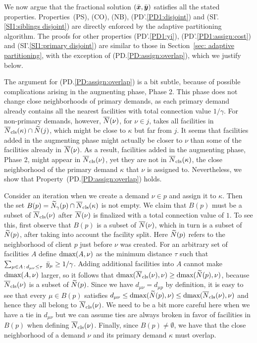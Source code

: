 \documentclass{llncs}
\begin{document}
\smallskip

We now argue that the fractional solution $(\bar{\boldsymbol{x}},\bar{\boldsymbol{y}})$
satisfies all the stated properties. Properties~(PS), (CO), (NB),
(PD'.\ref{PD1:disjoint}) and (SI'.\ref{SI1:siblings disjoint}) are
directly enforced by the adaptive partitioning algorithm. The proofs
for other properties (PD'.\ref{PD1:yi}), (PD'.\ref{PD1:assign:cost})
and (SI'.\ref{SI1:primary disjoint}) are similar to those in
Section~\ref{sec: adaptive partitioning}, with the exception of
(PD.\ref{PD:assign:overlap}), which we justify below.

The argument for (PD.\ref{PD:assign:overlap}) is a bit subtle, because
of possible complications arising in the augmenting phase, Phase 2.
This phase does not change close neighborhoods of primary demands, as
each primary demand already contains all the nearest facilities with
total connection value $1/\gamma$.  For non-primary demands, however,
${\overline{N}}(\nu)$, for $\nu\in j$, takes all facilities in
${\overline{N}}_{\text{cls}}(\kappa)\cap {\widetilde N}(j)$, which might be close to $\kappa$
but far from $j$.  It seems that facilities added in the augmenting
phase might actually be closer to $\nu$ than some of the facilities
already in ${\overline{N}}(\nu)$. As a result, facilities added in the
augmenting phase, Phase 2, might appear in ${\overline{N}}_{\text{cls}}(\nu)$, yet they
are not in ${\overline{N}}_{\text{cls}}(\kappa)$, the close neighborhood of the primary
demand $\kappa$ that $\nu$ is assigned to.  Nevertheless, we show that
Property~(PD.\ref{PD:assign:overlap}) holds.

Consider an iteration when we create a demand $\nu\in p$
and assign it to $\kappa$. Then the set
$B(p)={\widetilde N}_{\gamma}(p)\cap {\overline{N}}_{\text{cls}}(\kappa)$ is not empty.
We claim that
$B(p)$ must be a subset of ${\overline{N}}_{\text{cls}}(\nu)$ after ${\overline{N}}(\nu)$ is
finalized with a total connection value of $1$. To see this, first
observe that $B(p)$ is a subset of ${\overline{N}}(\nu)$, which in turn is a
subset of ${\widetilde N}(p)$, after taking into account the facility
split. Here ${\widetilde N}(p)$ refers to the neighborhood of client $p$
just before $\nu$ was created. For an arbitrary set of facilities
$A$ define $\text{dmax}(A, \nu)$ as the minimum distance $\tau$ such
that $\sum_{\mu\in A {\,:\,} d_{\mu\nu} \leq \tau}\;{\bar y}_{\mu} \geq
1/\gamma$.
Adding additional facilities into $A$ cannot make
$\text{dmax}(A, \nu)$ larger, so it follows that $\text{dmax}({\overline{N}}_{\text{cls}}(\nu), \nu)
\geq \text{dmax}({\widetilde N}(p), \nu)$, because ${\overline{N}}_{\text{cls}}(\nu)$ is a subset of
${\widetilde N}(p)$. Since we have $d_{\mu \nu} = d_{\mu p}$ by definition,
it is easy to see that every $\mu \in B(p)$ satisfies $d_{\mu \nu}
\leq \text{dmax}({\widetilde N}(p), \nu) \leq \text{dmax}({\overline{N}}_{\text{cls}}(\nu), \nu)$ and
hence they all belong to ${\overline{N}}_{\text{cls}}(\nu)$. We need to be a bit more
careful here when we have a tie in $d_{\mu\nu}$ but we can assume ties
are always broken in favor of facilities in $B(p)$ when defining
${\overline{N}}_{\text{cls}}(\nu)$. Finally, since $B(p)\neq\emptyset$, we have that the
close neighborhood of a demand $\nu$ and its primary demand $\kappa$
must overlap.
\end{document}
